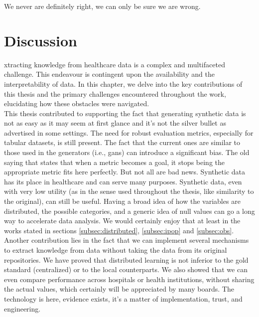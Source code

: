
\begin{savequote}[75mm]
We never are definitely right, we can only be sure we are wrong.
\end{savequote}
\chapter{Discussion} \label{chap:disc}



xtracting knowledge from healthcare data is a complex and multifaceted challenge. This endeavour is contingent upon the availability and the interpretability of data. In this chapter, we delve into the key contributions of this thesis and the primary challenges encountered throughout the work, elucidating how these obstacles were navigated. \\

This thesis contributed to supporting the fact that generating synthetic data is not as easy as it may seem at first glance and it's not the silver bullet as advertised in some settings. The need for robust evaluation metrics, especially for tabular datasets, is still present. The fact that the current ones are similar to those used in the generators (i.e., \acp{gan}) can introduce a significant bias. The old saying that states that when a metric becomes a goal, it stops being the appropriate metric fits here perfectly. But not all are bad news. Synthetic data has its place in healthcare and can serve many purposes. Synthetic data, even with very low utility (as in the sense used throughout the thesis, like similarity to the original), can still be useful. Having a broad idea of how the variables are distributed, the possible categories, and a generic idea of null values can go a long way to accelerate data analysis. We would certainly enjoy that at least in the works stated in sections \ref{subsec:distributed}, \ref{subsec:ipop} and \ref{subsec:obs}. \\

Another contribution lies in the fact that we can implement several mechanisms to extract knowledge from data without taking the data from its original repositories. We have proved that distributed learning is not inferior to the gold standard (centralized) or to the local counterparts. We also showed that we can even compare performance across hospitals or health institutions, without sharing the actual values, which certainly will be appreciated by many boards. The technology is here, evidence exists, it's a matter of implementation, trust, and engineering. \\

